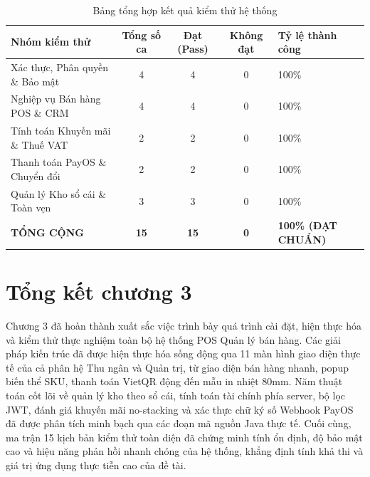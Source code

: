 \begin{table}[htbp]
\centering
\caption{Bảng tổng hợp kết quả kiểm thử hệ thống}
\label{tab:test_summary}
\vspace{2mm}
\begin{tabularx}{\textwidth}{|p{4.5cm}|c|c|c|X|}
\hline
\textbf{Nhóm kiểm thử} & \textbf{Tổng số ca} & \textbf{Đạt (Pass)} & \textbf{Không đạt} & \textbf{Tỷ lệ thành công} \\ \hline
Xác thực, Phân quyền \& Bảo mật & 4 & 4 & 0 & 100\% \\ \hline
Nghiệp vụ Bán hàng POS \& CRM & 4 & 4 & 0 & 100\% \\ \hline
Tính toán Khuyến mãi \& Thuế VAT & 2 & 2 & 0 & 100\% \\ \hline
Thanh toán PayOS \& Chuyển đổi & 2 & 2 & 0 & 100\% \\ \hline
Quản lý Kho sổ cái \& Toàn vẹn & 3 & 3 & 0 & 100\% \\ \hline
\textbf{TỔNG CỘNG} & \textbf{15} & \textbf{15} & \textbf{0} & \textbf{100\% (ĐẠT CHUẨN)} \\ \hline
\end{tabularx}
\end{table}

\section{Tổng kết chương 3}
Chương 3 đã hoàn thành xuất sắc việc trình bày quá trình cài đặt, hiện thực hóa và kiểm thử thực nghiệm toàn bộ hệ thống POS Quản lý bán hàng. Các giải pháp kiến trúc đã được hiện thực hóa sống động qua 11 màn hình giao diện thực tế của cả phân hệ Thu ngân và Quản trị, từ giao diện bán hàng nhanh, popup biến thể SKU, thanh toán VietQR động đến mẫu in nhiệt 80mm. Năm thuật toán cốt lõi về quản lý kho theo sổ cái, tính toán tài chính phía server, bộ lọc JWT, đánh giá khuyến mãi no-stacking và xác thực chữ ký số Webhook PayOS đã được phân tích minh bạch qua các đoạn mã nguồn Java thực tế. Cuối cùng, ma trận 15 kịch bản kiểm thử toàn diện đã chứng minh tính ổn định, độ bảo mật cao và hiệu năng phản hồi nhanh chóng của hệ thống, khẳng định tính khả thi và giá trị ứng dụng thực tiễn cao của đề tài.
